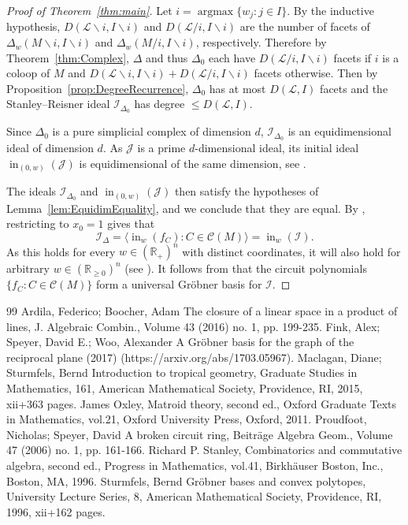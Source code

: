 \documentclass[10pt]{amsart}
\theoremstyle{definition}
\newcommand{\R}{\mathbb{R}}
\newcommand{\I}{\mathcal{I}}
\newcommand{\J}{\mathcal{J}}
\newcommand{\cL}{\mathcal{L}}
\newcommand{\CC}{\mathcal{C}}
\DeclareMathOperator{\In}{in}
\DeclareMathOperator{\argmax}{argmax}
\newcommand{\reldp}{\mathrel{:}}
\begin{document}
\begin{proof}[Proof of Theorem~\ref{thm:main}]
Let $i = \argmax \{w_j : j\in I\}$. By the inductive hypothesis, $D(\cL\backslash i, I\backslash i)$ and $D(\cL/ i, I\backslash i)$
are the number of facets of $\Delta_w(M\backslash i, I\backslash i)$ and $\Delta_w(M/i, I\backslash i)$, respectively. 
Therefore by Theorem~\ref{thm:Complex}, $\Delta$ and thus $\Delta_0$ each have 
$D(\cL/ i, I\backslash i)$ facets if $i$ is a coloop of $M$ and $D(\cL\backslash i, I\backslash i) + D(\cL/ i, I\backslash i)$ facets otherwise. 
Then by Proposition~\ref{prop:DegreeRecurrence}, $\Delta_0$ has at most $D(\cL, I)$ facets and the Stanley--Reisner ideal 
$\I_{\Delta_0}$ has degree $\leq D(\cL, I)$. 


Since $\Delta_0$ is a pure simplicial complex of dimension $d$, $\I_{\Delta_0}$ is an 
equidimensional ideal of dimension $d$. 
As $\J$ is a prime $d$-dimensional ideal, its initial ideal $\In_{(0,w)}(\J)$ is equidimensional of the same 
dimension, see \cite[Lemma~2.4.12]{tropBook}. 

The ideals $\I_{\Delta_0}$ and $\In_{(0,w)}(\J)$ then satisfy the hypotheses of Lemma~\ref{lem:EquidimEquality}, 
and we conclude that they are equal. By \cite[Prop.~2.6.1]{tropBook}, restricting to $x_0=1$ 
gives that 
\[
\I_{\Delta}  =  \langle \In_w(f_C) \reldp  C\in \CC (M) \rangle =  \In_w(\I). 
\]
As this holds for every $w\in (\R_+)^n$ with distinct coordinates, it will also hold for arbitrary $w \in (\R_{\geq 0})^n$ (see \cite[Prop.~1.13]{GrobnerPolytope}).
It follows from \cite[Cor.~1.9, 1.10]{GrobnerPolytope} that the circuit polynomials $\{f_C : C\in \CC (M)\}$ form a universal Gr\"obner basis for $\I$. 
\end{proof}
\begin{thebibliography}{99}
 Ardila, Federico; Boocher, Adam The closure of a linear space in a product of lines, J. Algebraic Combin., Volume 43 (2016) no. 1, pp. 199-235.
 Fink, Alex; Speyer, David E.; Woo, Alexander A Gröbner basis for the graph of the reciprocal plane (2017) (https://arxiv.org/abs/1703.05967).
 Maclagan, Diane; Sturmfels, Bernd Introduction to tropical geometry, Graduate Studies in Mathematics, 161, American Mathematical Society, Providence, RI, 2015, xii+363 pages.
 James Oxley, Matroid theory, second ed., Oxford Graduate Texts in Mathematics, vol.21, Oxford University Press, Oxford, 2011.
 Proudfoot, Nicholas; Speyer, David A broken circuit ring, Beiträge Algebra Geom., Volume 47 (2006) no. 1, pp. 161-166.
 Richard P. Stanley, Combinatorics and commutative algebra, second ed., Progress in Mathematics, vol.41, Birkhäuser Boston, Inc., Boston, MA, 1996.
 Sturmfels, Bernd Gröbner bases and convex polytopes, University Lecture Series, 8, American Mathematical Society, Providence, RI, 1996, xii+162 pages.
\end{thebibliography}
\end{document}
